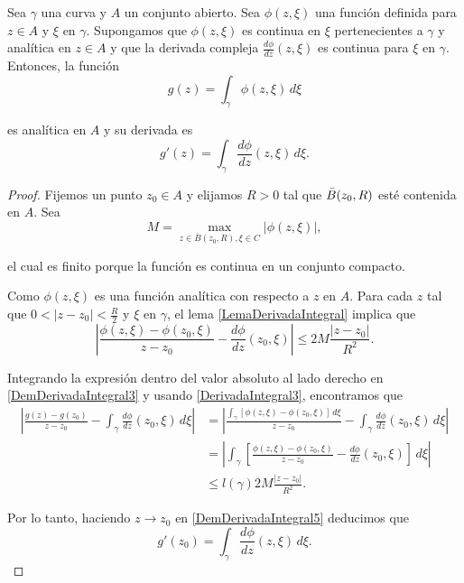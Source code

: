 \begin{teorema} \label{TeoDerivadaIntegral}
Sea $\gamma$ una curva y $A$ un conjunto abierto. Sea $\phi(z,\xi)$ una función definida para $z \in A$ y $\xi$ en $\gamma$. Supongamos que $\phi(z,\xi)$ es continua en $\xi$ pertenecientes a $\gamma$ y analítica en $z\in A$ y que la derivada compleja $\frac{d\phi}{dz}(z,\xi)$ es continua para $\xi$ en $\gamma$. Entonces, la función
\begin{equation}
g(z) = \int_{\gamma} \phi(z,\xi) \,d\xi    \label{DerivadaIntegral3}
\end{equation}

es analítica en $A$ y su derivada es
\begin{equation}
g'(z) = \int_{\gamma} \frac{d\phi}{dz}(z,\xi) \,d\xi.    \label{DerivadaIntegral4}
\end{equation}

\end{teorema}

\begin{proof}
Fijemos un punto $z_0 \in A$ y elijamos $R > 0$ tal que $\Bar{B}(z_0,R)$ esté contenida en $A$. Sea 
$$M = \max_{z \in \overline{B}(z_0,R), \xi \in C} |\phi(z,\xi)|,$$

el cual es finito porque la función es continua en un conjunto compacto. 

Como $\phi(z,\xi)$ es una función analítica con respecto a $z$ en $A$. Para cada $z$ tal que $0 < |z-z_0| < \frac{R}{2}$ y $\xi$ en $\gamma$, el lema \ref{LemaDerivadaIntegral} implica que
\begin{equation}
\left| \frac{\phi(z,\xi) - \phi(z_0,\xi)}{z-z_0} - \frac{d\phi}{dz}(z_0,\xi) \right| \leq 2M \frac{|z-z_0|}{R^2}.    \label{DemDerivadaIntegral3}
\end{equation}

Integrando la expresión dentro del valor absoluto al lado derecho en \eqref{DemDerivadaIntegral3} y usando \eqref{DerivadaIntegral3}, encontramos que
\begin{align}
    \left| \frac{g(z)-g(z_0)}{z-z_0} - \int_{\gamma} \frac{d\phi}{dz}(z_0,\xi) \,d\xi \right| &= \left| \frac{\int_{\gamma} [\phi(z,\xi) - \phi(z_0,\xi)] \,d\xi}{z-z_0} - \int_{\gamma} \frac{d\phi}{dz}(z_0,\xi) \,d\xi \right| \nonumber \\
    &= \left| \int_{\gamma} \left[ \frac{\phi(z,\xi) - \phi(z_0,\xi)}{z-z_0} - \frac{d\phi}{dz}(z_0,\xi) \right] \,d\xi  \right|  \nonumber \\
    &\leq l(\gamma) 2M \frac{|z-z_0|}{R^2}. \label{DemDerivadaIntegral5}
\end{align}

Por lo tanto, haciendo $z \to z_0$ en \eqref{DemDerivadaIntegral5} deducimos que 
$$g'(z_0) =  \int_{\gamma} \frac{d\phi}{dz}(z,\xi) \,d\xi.$$
\end{proof}

